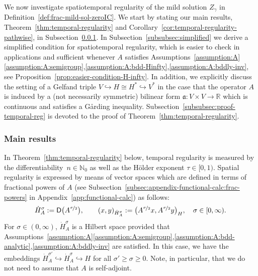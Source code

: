 \documentclass[reqno]{amsart}
\numberwithin{equation}{section}
\newcommand{\bbN}{\mathbb{N}}
\newcommand{\bbR}{\mathbb{R}}
\newcommand{\from}{\colon}
\newcommand{\dual}[1]{#1^*}
\newcommand{\Hdot}[1]{\dot{H}^{#1}_A}
\theoremstyle{remark}
\theoremstyle{definition}
\begin{document}
We now investigate 
spatiotemporal regularity 
of the mild solution $Z_\gamma$ 
in Definition~\ref{def:frac-mild-sol-zeroIC}. 
We start by stating our 
main results, 
Theorem~\ref{thm:temporal-regularity} 
and Corollary~\ref{cor:temporal-regularity-pathwise}, 
in Subsection~\ref{subsubsec:main-results}. 
In Subsection~\ref{subsubsec:simplified} 
we derive 
a simplified condition 
for spatiotemporal regularity, 
which is easier to check in applications 
and 
sufficient whenever $A$ satisfies 
Assumptions~\ref{assumption:A}\ref{assumption:A:semigroup},\ref{assumption:A:bdd-Hinfty},\ref{assumption:A:bddly-inv}, 
see Proposition~\ref{prop:easier-condition-H-infty}. 
In addition, we explicitly discuss the setting of 
a Gelfand triple $V\hookrightarrow H \cong \dual H \hookrightarrow \dual V$ 
in the case that the operator $A$ is induced by a 
(not necessarily symmetric) bilinear form $\mathfrak{a} \from V\times V\to \bbR$
which is continuous and satisfies a G{\aa}rding inequality. 
%
Subsection~\ref{subsubsec:proof-temporal-reg} 
is devoted to 
the proof of 
Theorem~\ref{thm:temporal-regularity}. 

\subsubsection{Main results} 
\label{subsubsec:main-results} 

In Theorem~\ref{thm:temporal-regularity} below, 
temporal regularity is measured by the differentiability~$n\in\bbN_0$ 
as well as the H\"older exponent 
$\tau\in[0,1)$. 
Spatial regularity is expressed 
by means of vector spaces which are  
defined in terms of fractional powers of $A$
(see Subsection~\ref{subsec:appendix-functional-calc:frac-powers} 
in Appendix~\ref{app:functional-calc}) 
as follows:  
%
\[
\dot H_A^\sigma := \mathsf D\bigl( A^{\nicefrac{\sigma}{2}} \bigr), 
\qquad 
(x, y)_{\dot H_A^\sigma} 
:= 
\bigl( A^{\nicefrac{\sigma}{2}} x, A^{\nicefrac{\sigma}{2}} y \bigr)_H, \quad \sigma\in[0,\infty).
\] 
%
For $\sigma\in(0,\infty)$, $\dot H_A^\sigma$ is a Hilbert space 
provided that  
Assumptions~\ref{assumption:A}\ref{assumption:A:semigroup},\ref{assumption:A:bdd-analytic},\ref{assumption:A:bddly-inv} 
are satisfied. 
In this case, we have the embeddings   
$\Hdot{\sigma'} \hookrightarrow \Hdot\sigma\hookrightarrow H$ 
for all $\sigma'\geq\sigma\geq 0$. 
Note, in particular, that we do not need to assume 
that $A$ is self-adjoint. 
\end{document}
